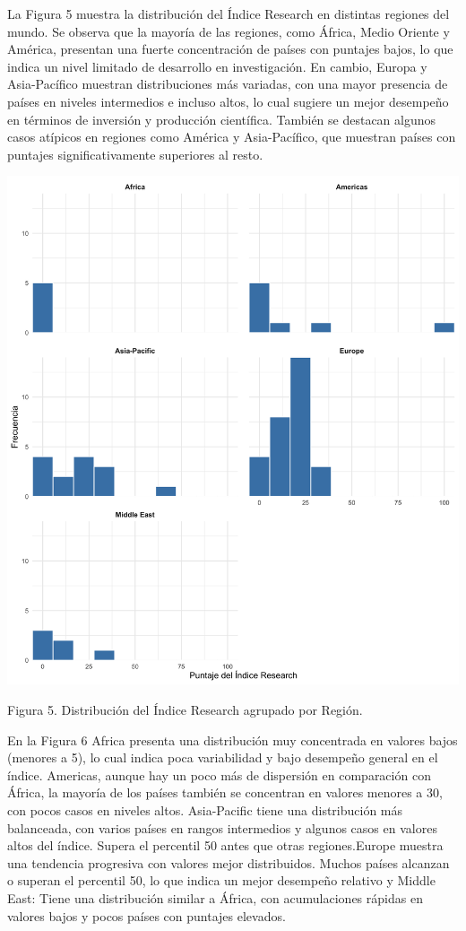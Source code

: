 \documentclass[
]{article}
\begin{document}
\begin{multicols}{2}

La Figura 5 muestra la distribución del Índice Research en distintas regiones del mundo. Se observa que la mayoría de las regiones, como África, Medio Oriente y América, presentan una fuerte concentración de países con puntajes bajos, lo que indica un nivel limitado de desarrollo en investigación. En cambio, Europa y Asia-Pacífico muestran distribuciones más variadas, con una mayor presencia de países en niveles intermedios e incluso altos, lo cual sugiere un mejor desempeño en términos de inversión y producción científica. También se destacan algunos casos atípicos en regiones como América y Asia-Pacífico, que muestran países con puntajes significativamente superiores al resto.



\begin{center}
\includegraphics[width=\linewidth]{figura5.png}
\end{center}
Figura 5. Distribución del Índice Research agrupado por Región.

En la Figura 6 Africa presenta una distribución muy concentrada en valores bajos (menores a 5), lo cual indica poca variabilidad y bajo desempeño general en el índice. Americas, aunque hay un poco más de dispersión en comparación con África, la mayoría de los países también se concentran en valores menores a 30, con pocos casos en niveles altos. Asia-Pacific tiene una distribución más balanceada, con varios países en rangos intermedios y algunos casos en valores altos del índice. Supera el percentil 50 antes que otras regiones.Europe muestra una tendencia progresiva con valores mejor distribuidos. Muchos países alcanzan o superan el percentil 50, lo que indica un mejor desempeño relativo y Middle East: Tiene una distribución similar a África, con acumulaciones rápidas en valores bajos y pocos países con puntajes elevados.


\end{multicols}
\end{document}
